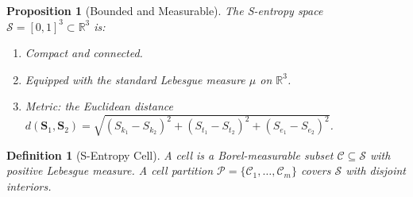 \documentclass[twocolumn,11pt,a4paper]{article}
\newtheorem{proposition}[theorem]{Proposition}
\newtheorem{definition}[theorem]{Definition}
\newcommand{\Sk}{S_{k}}
\newcommand{\St}{S_{t}}
\newcommand{\Se}{S_{e}}
\newcommand{\Stuple}{\mathbf{S}}
\newcommand{\calC}{\mathcal{C}}
\newcommand{\calP}{\mathcal{P}}
\newcommand{\calS}{\mathcal{S}}
\begin{document}
\begin{proposition}[Bounded and Measurable]
The S-entropy space $\calS = [0,1]^3 \subset \mathbb{R}^3$ is:
\begin{enumerate}[nosep,label=(\roman*)]
  \item Compact and connected.
  \item Equipped with the standard Lebesgue measure $\mu$ on $\mathbb{R}^3$.
  \item Metric: the Euclidean distance $d(\Stuple_1, \Stuple_2) = \sqrt{(\Sk_1 - \Sk_2)^2 + (\St_1 - \St_2)^2 + (\Se_1 - \Se_2)^2}$.
\end{enumerate}
\end{proposition}

\begin{definition}[S-Entropy Cell]
A \emph{cell} is a Borel-measurable subset $\calC \subseteq \calS$ with positive Lebesgue measure. A \emph{cell partition} $\calP = \{\calC_1, \ldots, \calC_m\}$ covers $\calS$ with disjoint interiors.
\end{definition}
\end{document}
